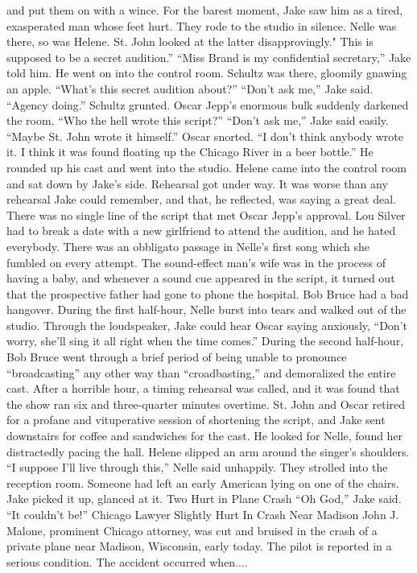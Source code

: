 \documentclass{novel}
\begin{document}
and put them on with a wince. For the barest moment, Jake saw him as a tired, exasperated man whose feet hurt. They rode to the studio in silence. Nelle was there, so was Helene. St. John looked at the latter disapprovingly." This is supposed to be a secret audition.” “Miss Brand is my confidential secretary,” Jake told him. He went on into the control room. Schultz was there, gloomily gnawing an apple. “What’s this secret audition about?” “Don’t ask me,” Jake said. “Agency doing.” Schultz grunted. Oscar Jepp’s enormous bulk suddenly darkened the room. “Who the hell wrote this script?” “Don’t ask me,” Jake said easily. “Maybe St. John wrote it himself.” Oscar snorted. “I don’t think anybody wrote it. I think it was found floating up the Chicago River in a beer bottle.” He rounded up his cast and went into the studio. Helene came into the control room and sat down by Jake’s side. Rehearsal got under way. It was worse than any rehearsal Jake could remember, and that, he reflected, was saying a great deal. There was no single line of the script that met Oscar Jepp's approval. Lou Silver had to break a date with a new girlfriend to attend the audition, and he hated everybody. There was an obbligato passage in Nelle’s first song which she fumbled on every attempt. The sound-effect man’s wife was in the process of having a baby, and whenever a sound cue appeared in the script, it turned out that the prospective father had gone to phone the hospital. Bob Bruce had a bad hangover. During the first half-hour, Nelle burst into tears and walked out of the studio. Through the loudspeaker, Jake could hear Oscar saying anxiously, “Don’t worry, she’ll sing it all right when the time comes.” During the second half-hour, Bob Bruce went through a brief period of being unable to pronounce “broadcasting” any other way than “croadbasting,” and demoralized the entire cast. After a horrible hour, a timing rehearsal was called, and it was found that the show ran six and three-quarter minutes overtime. St. John and Oscar retired for a profane and vituperative session of shortening the script, and Jake sent downstairs for coffee and sandwiches for the cast. He looked for Nelle, found her distractedly pacing the hall. Helene slipped an arm around the singer’s shoulders. “I suppose I'll live through this,” Nelle said unhappily. They strolled into the reception room. Someone had left an early American lying on one of the chairs. Jake picked it up, glanced at it. Two Hurt in Plane Crash “Oh God,” Jake said. “It couldn’t be!” Chicago Lawyer Slightly Hurt In Crash Near Madison John J. Malone, prominent Chicago attorney, was cut and bruised in the crash of a private plane near Madison, Wisconsin, early today. The pilot is reported in a serious condition. The accident occurred when....
\end{document}
